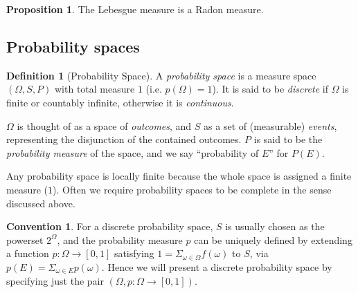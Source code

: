 \documentclass{article}
\theoremstyle{definition}
\newtheorem{definition}{Definition}[section]
\newtheorem{convention}{Convention}[section]
\newtheorem{proposition}[theorem]{Proposition}
\begin{document}
\begin{proposition}
  The Lebesgue measure is a Radon measure.
\end{proposition}


\subsection{Probability spaces}

\begin{definition}[Probability Space] 
  A {\em probability space} is a measure space \((\Omega, S, P)\) with total measure \(1\) (i.e.{} \(p(\Omega)=1\)). It is said to be {\em discrete} if \(\Omega\) is finite or countably infinite, otherwise it is {\em continuous}.
\end{definition}
\(\Omega\) is thought of as a space of {\em outcomes}, and \(S\) as a set of (measurable) {\em events}, representing the disjunction of the contained outcomes. \(P\) is said to be the {\em probability measure} of the space, and we say ``probability of \(E\)'' for \(P(E)\).

Any probability space is locally finite because the whole space is assigned a finite measure (\(1\)). Often we require probability spaces to be complete in the sense discussed above.

\begin{convention}\label{convention:discrete-ps}
For a discrete probability space, \(S\) is usually chosen as the powerset \(2^{\Omega}\), and the probability measure \(p\) can be uniquely defined by extending a function \(p:\Omega\rightarrow [0,1]\) satisfying \(1=\Sigma_{\omega \in \Omega} f(\omega)\) to \(S\), via \(p(E)=\Sigma_{\omega \in E} p(\omega)\).  Hence we will present a discrete probability space by specifying just the pair \((\Omega, p:\Omega \rightarrow [0,1])\).
\end{convention}
\end{document}
